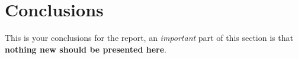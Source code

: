 


\section{Conclusions}
This is your conclusions for the report, an \textit{important} part of this section is that \textbf{nothing new should be presented here}.